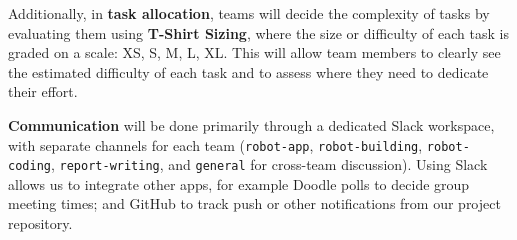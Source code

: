 \documentclass{article}
\begin{document}
Additionally, in {\bf task allocation}, teams will decide the complexity of tasks by evaluating them using {\bf T-Shirt Sizing}, where the size or difficulty of each task is graded on a scale: XS, S, M, L, XL. This will allow team members to clearly see the estimated difficulty of each task and to assess where they need to dedicate their effort. 

{\bf Communication} will be done primarily through a dedicated Slack workspace, with separate channels for each team ({\tt robot-app}, {\tt robot-building}, {\tt robot-coding}, {\tt report-writing}, and {\tt general} for cross-team discussion). Using Slack allows us to integrate other apps, for example Doodle polls to decide group meeting times; and GitHub to track push or other notifications from our project repository. 




\end{document}
